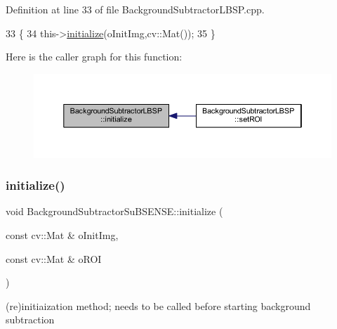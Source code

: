 Definition at line 33 of file Background\+Subtractor\+L\+B\+S\+P.\+cpp.


\begin{DoxyCode}
33                                                                \{
34     this->\mbox{\hyperlink{class_background_subtractor_l_b_s_p_ac6b854f94414497b143375d4a0ae8b6f}{initialize}}(oInitImg,cv::Mat());
35 \}
\end{DoxyCode}
Here is the caller graph for this function\+:\nopagebreak
\begin{figure}[H]
\begin{center}
\leavevmode
\includegraphics[width=350pt]{class_background_subtractor_l_b_s_p_ac6b854f94414497b143375d4a0ae8b6f_icgraph}
\end{center}
\end{figure}
\mbox{\label{class_background_subtractor_su_b_s_e_n_s_e_ac84aa66030b04a72435ef473cf0e6a3f}} 
\subsubsection{\texorpdfstring{initialize()}{initialize()}\hspace{0.1cm}{\footnotesize\ttfamily [2/2]}}
{\footnotesize\ttfamily void Background\+Subtractor\+Su\+B\+S\+E\+N\+S\+E\+::initialize (\begin{DoxyParamCaption}\item[{const cv\+::\+Mat \&}]{o\+Init\+Img,  }\item[{const cv\+::\+Mat \&}]{o\+R\+OI }\end{DoxyParamCaption})\hspace{0.3cm}{\ttfamily [virtual]}}



(re)initiaization method; needs to be called before starting background subtraction 



